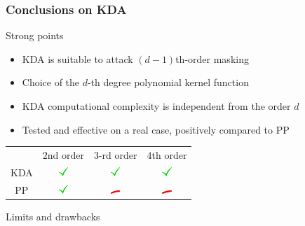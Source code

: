 \begin{frame}
\frametitle{Conclusions on KDA}
\begin{block}{Strong points}
\begin{itemize}
\item KDA is suitable to attack $(d-1)$th-order masking
\item Choice of the $d$-th degree polynomial kernel function
\item KDA computational complexity is independent from the order $d$
\item Tested and effective on a real case, positively compared to PP 
\end{itemize}
\begin{table}[]
\begin{tabular}{cccc}
    & $2$nd order & $3$-rd order & $4$th order \\
KDA & \includegraphics[width=10pt]{figures/yes.png}          & \includegraphics[width=10pt]{figures/yes.png}           & \includegraphics[width=10pt]{figures/yes.png}          \\
PP  & \includegraphics[width=10pt]{figures/yes.png}          & \includegraphics[width=10pt]{figures/no.png}            & \includegraphics[width=10pt]{figures/no.png}          
\end{tabular}
\end{table}
\end{block}

\begin{block}{Limits and drawbacks}
\end{block}



\end{frame}
